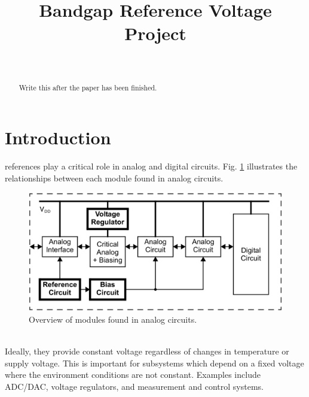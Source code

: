 \documentclass[conference]{IEEEtran}
\begin{document}
%
\title{Bandgap Reference Voltage Project}

\author{
\\
\and
{}
\and
{}
}

\maketitle

\begin{abstract}
Write this after the paper has been finished.
\end{abstract}
\IEEEpeerreviewmaketitle

\section{Introduction}
 references play a critical role in analog and digital circuits.  Fig. \ref{fig:overview} illustrates the relationships between each module found in analog circuits.
\begin{figure}[!htbp]
  \centering
  \includegraphics[scale=0.25]{images/overview.png}
  \caption[Overview]{Overview of modules found in analog circuits.\footnotemark}
  \label{fig:overview}
\end{figure}
\\Ideally, they provide constant voltage regardless of changes in temperature or supply voltage.  This is important for subsystems which depend on a fixed voltage where the environment conditions are not constant.  Examples include ADC/DAC, voltage regulators, and measurement and control systems.
\end{document}
